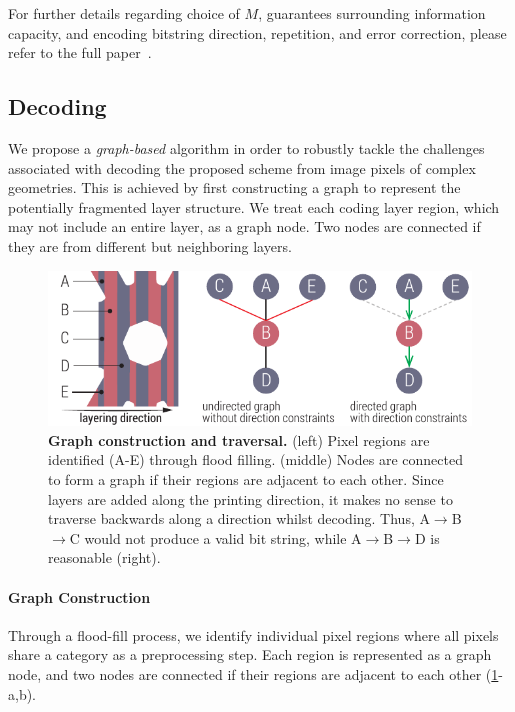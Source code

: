 \documentclass[12pt]{report}
\begin{document}
For further details regarding choice of $M$, guarantees surrounding information capacity, and encoding bitstring direction, repetition, and error correction, please refer to the full paper~\cite{Maia:2019}.

\subsection{Decoding}\label{sec:layercode_decode}

We propose a \emph{graph-based} algorithm in order to robustly tackle the challenges
associated with decoding the proposed scheme from image pixels of complex geometries. 
This is achieved by first constructing a graph to 
represent the potentially fragmented layer structure.
We treat each coding layer region, which may
not include an entire layer, as a graph node. 
Two nodes are connected if they are from
different but neighboring layers.

\begin{figure}[t]
    \centering
    \vspace{-7mm}
	\includegraphics[width=0.80\linewidth]{figs/graph.pdf}
        \vspace{-1mm}
        \caption{\textbf{Graph construction and traversal. } 
        (left) Pixel regions are identified (A-E) through flood filling.
        (middle) Nodes are connected to form a graph if their regions are adjacent to each other.
        Since layers are added along the printing direction, it makes no
        sense to traverse backwards along a direction whilst
        decoding. Thus, A$\to$B$\to$C would not produce a valid bit string,
        while A$\to$B$\to$D is reasonable (right).
	\label{fig:directed_graph}}
    \vspace{-4mm}
\end{figure}

\paragraph{Graph Construction}\label{sec:graph_construction}
Through a flood-fill process, we identify individual pixel regions where all pixels
share a category as a preprocessing step.
Each region is represented as a graph node, and two nodes are connected if their regions are
adjacent to each other (\ref{fig:directed_graph}-a,b).
\end{document}
